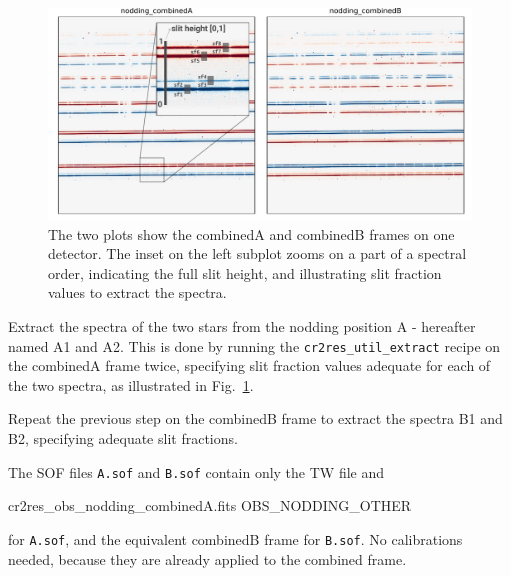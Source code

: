 \begin{figure}[!h]
  \begin{center}
    \includegraphics[width=1\textwidth]{figures/binary-nodding-combined}
  \end{center}
  \caption{
    \label{fig:binary-nodding}
    The two plots show the combinedA and combinedB frames
    on one detector. The inset on the left subplot zooms on a part of a
    spectral order, indicating the full slit height, 
    and illustrating slit fraction values to extract the spectra.}
\end{figure}

Extract the spectra of the two stars from the nodding position A -
hereafter named A1 and A2. This is done by running the \verb!cr2res_util_extract!
recipe on the combinedA frame twice, specifying slit fraction values adequate
for each of the two spectra, as illustrated in Fig.~\ref{fig:binary-nodding}.

Repeat the previous step on the combinedB frame to extract the spectra
B1 and B2, specifying adequate slit fractions.

\begin{shell}[fontsize=\small]
\end{shell}

The SOF files \verb!A.sof! and \verb!B.sof! contain only the TW file and
\begin{shell}[fontsize=\small]
    cr2res_obs_nodding_combinedA.fits OBS_NODDING_OTHER
\end{shell}
for \verb!A.sof!, and the equivalent combinedB frame for \verb!B.sof!.
No calibrations needed, because they are already applied to the combined frame.

